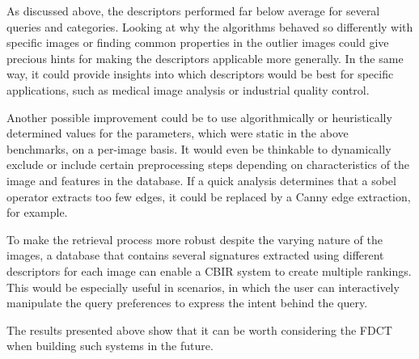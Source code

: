 As discussed above, the descriptors performed far below average for several
queries and categories. Looking at why the algorithms behaved so differently
with specific images or finding common properties in the outlier images could
give precious hints for making the descriptors applicable more generally. In
the same way, it could provide insights into which descriptors would be best
for specific applications, such as medical image analysis or industrial quality
    control.

Another possible improvement could be to use algorithmically or heuristically
determined values for the parameters, which were static in the above
benchmarks, on a per-image basis. It would even be thinkable to dynamically
exclude or include certain preprocessing steps depending on characteristics of
the image and features in the database. If a quick analysis determines that a
sobel operator extracts too few edges, it could be replaced by a Canny edge
extraction, for example.

To make the retrieval process more robust despite the varying nature of the
images, a database that contains several signatures extracted using different
descriptors for each image can enable a CBIR system to create multiple
rankings. This would be especially useful in scenarios, in which the user can
interactively manipulate the query preferences to express the intent behind the
query.

The results presented above show that it can be worth considering the FDCT when
building such systems in the future.
